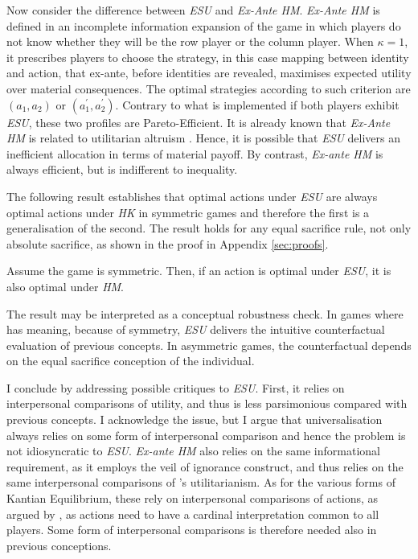 Now consider the difference between \textit{ESU} and \textit{Ex-Ante HM}. \textit{Ex-Ante HM} is defined in an incomplete information expansion of the game in which players do not know whether they will be the row player or the column player. When \(\kappa = 1\), it prescribes players to choose the strategy, in this case mapping between identity and action, that ex-ante, before identities are revealed, maximises expected utility over material consequences. The optimal strategies according to such criterion are \((a_1,a_2 )\) or \((a_1^{\prime}, a_2^{\prime} )\). Contrary to what is implemented if both players exhibit \textit{ESU}, these two profiles are Pareto-Efficient. It is already known that \textit{Ex-Ante HM} is related to utilitarian altruism \citep{laslierUniversalizationAltruism2022}. Hence, it is possible that \textit{ESU} delivers an inefficient allocation in terms of material payoff. By contrast, \textit{Ex-ante HM} is always efficient, but is indifferent to inequality.

The following result establishes that optimal actions under \textit{ESU} are always optimal actions under \textit{HK} in symmetric games and therefore the first is a generalisation of the second. The result holds for any equal sacrifice rule, not only absolute sacrifice, as shown in the proof in Appendix \ref{sec:proofs}.

\begin{prop}\label{prop:equivalent}
	Assume the game is symmetric. Then, if an action is optimal under \textit{ESU}, it is also optimal under \textit{HM}.
\end{prop}

The result may be interpreted as a conceptual robustness check. In games where  has meaning, because of symmetry, \textit{ESU} delivers the intuitive counterfactual evaluation of previous concepts. In asymmetric games, the counterfactual depends on the equal sacrifice conception of the individual.

I conclude by addressing possible critiques to \textit{ESU}. First, it relies on interpersonal comparisons of utility, and thus is less parsimonious compared with previous concepts. I acknowledge the issue, but I argue that universalisation always relies on some form of interpersonal comparison and hence the problem is not idiosyncratic to \textit{ESU}. \textit{Ex-ante HM} also relies on the same informational requirement, as it employs the veil of ignorance construct, and thus relies on the same interpersonal comparisons of \citeauthor{harsanyiCardinalUtilityWelfare1953}'s utilitarianism. As for the various forms of Kantian Equilibrium, these rely on interpersonal comparisons of actions, as argued by \cite{sherNormativeAspectsKantian2020}, as actions need to have a cardinal interpretation common to all players. Some form of interpersonal comparisons is therefore needed also in previous conceptions.

